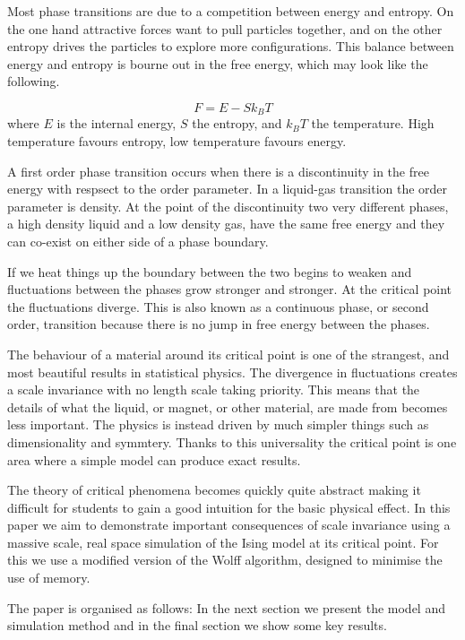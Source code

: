 \documentclass[aps,prl,reprint,groupedaddress]{revtex4-1}
\begin{document}
Most phase transitions are due to a competition between energy and entropy. On the one hand attractive forces want to pull particles together, and on the other entropy drives the particles to explore more configurations. This balance between energy and entropy is bourne out in the free energy, which may look like the following.

\begin{equation}
F = E - S k_B T
\end{equation}
where $E$ is the internal energy, $S$ the entropy, and $k_B T$ the temperature. High temperature favours entropy, low temperature favours energy.

A first order phase transition occurs when there is a discontinuity in the free energy with respsect to the order parameter. In a liquid-gas transition the order parameter is density. At the point of the discontinuity two very different phases, a high density liquid and a low density gas, have the same free energy and they can co-exist on either side of a phase boundary.

If we heat things up the boundary between the two begins to weaken and fluctuations between the phases grow stronger and stronger. At the critical point the fluctuations diverge. This is also known as a continuous phase, or second order, transition because there is no jump in free energy between the phases.


The behaviour of a material around its critical point is one of the strangest, and most beautiful results in statistical physics. The divergence in fluctuations creates a scale invariance with no length scale taking priority. This means that the details of what the liquid, or magnet, or other material, are made from becomes less important. The physics is instead driven by much simpler things such as dimensionality and symmtery. Thanks to this universality the critical point is one area where a simple model can produce exact results.

The theory of critical phenomena becomes quickly quite abstract making it difficult for students to gain a good intuition for the basic physical effect. In this paper we aim to demonstrate important consequences of scale invariance using a massive scale, real space simulation of the Ising model at its critical point. For this we use a modified version of the Wolff algorithm, designed to minimise the use of memory.

The paper is organised as follows: In the next section we present the model and simulation method and in the final section we show some key results.
\end{document}
